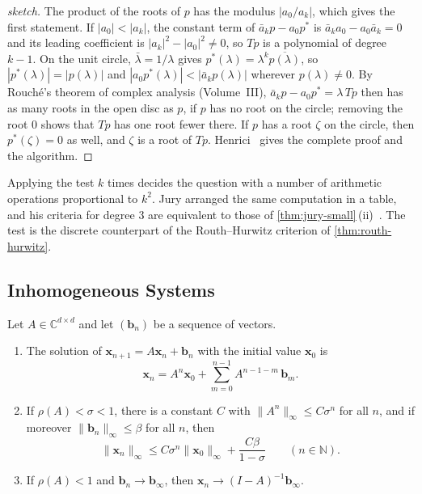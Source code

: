 \begin{proof}[sketch]
The product of the roots of $p$ has the modulus $|a_0/a_k|$, which gives the first statement. If $|a_0|<|a_k|$, the constant term of $\bar a_kp-a_0p^*$ is $\bar a_ka_0-a_0\bar a_k=0$ and its leading coefficient is $|a_k|^2-|a_0|^2\ne0$, so $Tp$ is a polynomial of degree $k-1$. On the unit circle, $\bar\lambda=1/\lambda$ gives $p^*(\lambda)=\lambda^k\overline{p(\lambda)}$, so $|p^*(\lambda)|=|p(\lambda)|$ and $|a_0p^*(\lambda)|<|\bar a_kp(\lambda)|$ wherever $p(\lambda)\ne0$. By Rouch\'e's theorem of complex analysis (Volume~III), $\bar a_kp-a_0p^*=\lambda\,Tp$ then has as many roots in the open disc as $p$, if $p$ has no root on the circle; removing the root $0$ shows that $Tp$ has one root fewer there. If $p$ has a root $\zeta$ on the circle, then $p^*(\zeta)=0$ as well, and $\zeta$ is a root of $Tp$. Henrici~\cite{henrici1974} gives the complete proof and the algorithm.
\end{proof}

Applying the test $k$ times decides the question with a number of arithmetic operations proportional to $k^2$. Jury arranged the same computation in a table, and his criteria for degree $3$ are equivalent to those of \cref{thm:jury-small}\,(ii)~\cite{jury1964}. The test is the discrete counterpart of the Routh--Hurwitz criterion of \cref{thm:routh-hurwitz}.

\subsection{Inhomogeneous Systems}

\begin{theorem}
\label{thm:discrete-duhamel}
Let $A\in\mathbb C^{d\times d}$ and let $(\mathbf b_n)$ be a sequence of vectors.
\begin{enumerate}
\item The solution of $\mathbf x_{n+1}=A\mathbf x_n+\mathbf b_n$ with the initial value $\mathbf x_0$ is
\begin{equation}
\mathbf x_n=A^n\mathbf x_0+\sum_{m=0}^{n-1}A^{n-1-m}\,\mathbf b_m .
\label{eq:discrete-duhamel}
\end{equation}
\item If $\rho(A)<\sigma<1$, there is a constant $C$ with $\|A^n\|_\infty\le C\sigma^n$ for all $n$, and if moreover $\|\mathbf b_n\|_\infty\le\beta$ for all $n$, then
\[
\|\mathbf x_n\|_\infty\le C\sigma^n\|\mathbf x_0\|_\infty+\frac{C\beta}{1-\sigma}\qquad(n\in\mathbb N).
\]
\item If $\rho(A)<1$ and $\mathbf b_n\to\mathbf b_\infty$, then $\mathbf x_n\to(I-A)^{-1}\mathbf b_\infty$.
\end{enumerate}
\end{theorem}

